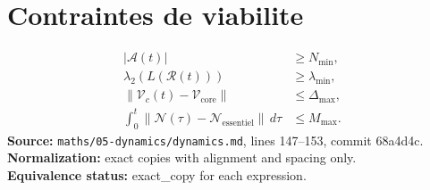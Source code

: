 \section*{Contraintes de viabilite}
\begin{align*}
|\mathcal{A}(t)| &\ge N_{\min},\\
\lambda_2(L(\mathcal{R}(t))) &\ge \lambda_{\min},\\
\|\mathcal{V}_c(t)-\mathcal{V}_{\mathrm{core}}\| &\le \Delta_{\max},\\
\int_0^t \|\mathcal{N}(\tau)-\mathcal{N}_{\mathrm{essentiel}}\|\,d\tau &\le M_{\max}.
\end{align*}
\textbf{Source:} \texttt{maths/05-dynamics/dynamics.md}, lines 147--153, commit 68a4d4c.\\
\textbf{Normalization:} exact copies with alignment and spacing only.\\
\textbf{Equivalence status:} exact\_copy for each expression.
